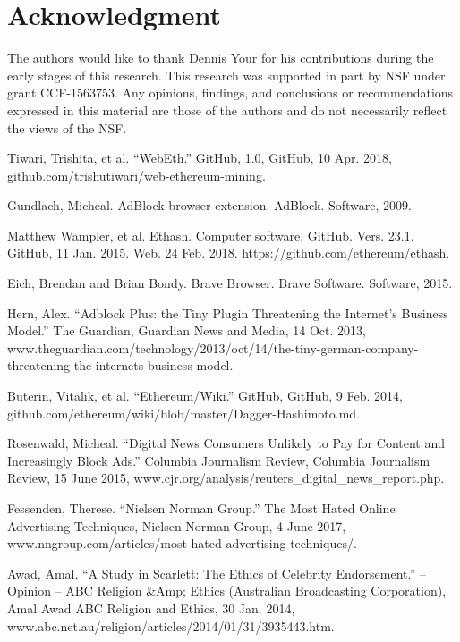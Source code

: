 \documentclass[runningheads]{llncs}
\begin{document}
\section*{Acknowledgment}
The authors would like to thank Dennis Your for his contributions during the early stages of this research. This research was supported in part by NSF under grant CCF-1563753. Any
opinions, findings, and conclusions or recommendations expressed in this material
are those of the authors and do not necessarily reflect the views of the
NSF.

\begin{thebibliography}{1}
 Tiwari, Trishita, et al. ``WebEth.'' GitHub, 1.0, GitHub, 10 Apr. 2018, github.com/trishutiwari/web-ethereum-mining.

 Gundlach, Micheal. AdBlock browser extension. AdBlock. Software, 2009.

Matthew Wampler, et al. Ethash. Computer software. GitHub. Vers. 23.1. GitHub, 11 Jan. 2015. Web. 24 Feb. 2018. https://github.com/ethereum/ethash. 

 Eich, Brendan and Brian Bondy. Brave Browser. Brave Software. Software, 2015.

 Hern, Alex. ``Adblock Plus: the Tiny Plugin Threatening the Internet's Business Model.'' The Guardian, Guardian News and Media, 14 Oct. 2013, www.theguardian.com/technology/2013/oct/14/the-tiny-german-company-threatening-the-internets-business-model.

 Buterin, Vitalik, et al. ``Ethereum/Wiki.'' GitHub, GitHub, 9 Feb. 2014, github.com/ethereum/wiki/blob/master/Dagger-Hashimoto.md. 

 Rosenwald, Micheal. ``Digital News Consumers Unlikely to Pay for Content and Increasingly Block Ads.'' Columbia Journalism Review, Columbia Journalism Review, 15 June 2015, www.cjr.org/analysis/reuters\_digital\_news\_report.php.

 Fessenden, Therese. ``Nielsen Norman Group.'' The Most Hated Online Advertising Techniques, Nielsen Norman Group, 4 June 2017, www.nngroup.com/articles/most-hated-advertising-techniques/.

 Awad, Amal. ``A Study in Scarlett: The Ethics of Celebrity Endorsement.'' – Opinion – ABC Religion \&Amp; Ethics (Australian Broadcasting Corporation), Amal Awad ABC Religion and Ethics, 30 Jan. 2014, www.abc.net.au/religion/articles/2014/01/31/3935443.htm.


\end{thebibliography}
\end{document}
